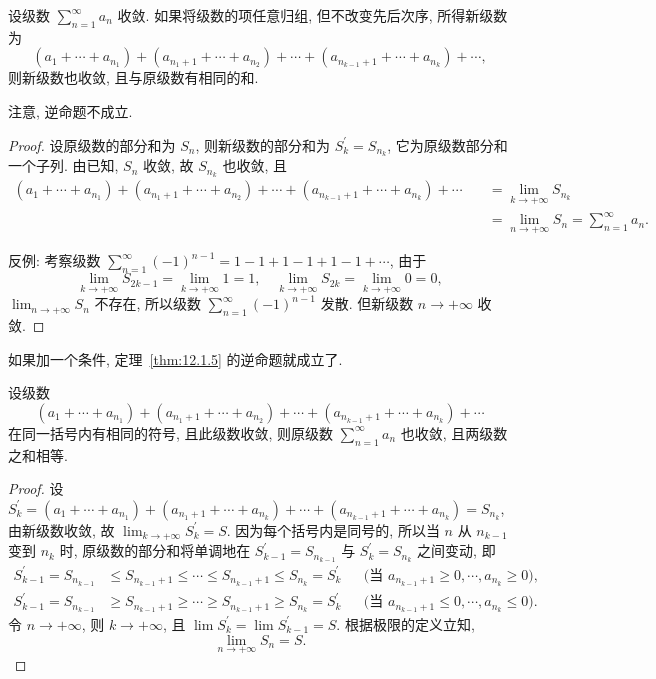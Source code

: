 \begin{theorem}\label{thm:12.1.5}
设级数 $\sum_{n=1}^{\infty}a_{n}$ 收敛. 如果将级数的项任意归组, 但不改变先后次序, 所得新级数为
\[
  (a_{1}+\cdots+a_{n_{1}})+(a_{n_{1}+1}+\cdots+a_{n_{2}})+\cdots+(a_{n_{k-1}+1}+\cdots+a_{n_{k}})+\cdots,
\]
则新级数也收敛, 且与原级数有相同的和.

注意, 逆命题不成立.
\end{theorem}

\begin{proof}
设原级数的部分和为 $S_{n}$, 则新级数的部分和为 $S_{k}^{\prime}=S_{n_{k}}$, 它为原级数部分和一个子列. 由已知, $S_{n}$ 收敛, 故 $S_{n_{k}}$ 也收敛, 且
\begin{align*}
  (a_{1}+\cdots+a_{n_{1}})+(a_{n_{1}+1}+\cdots+a_{n_{2}})+\cdots+(a_{n_{k-1}+1}+\cdots+a_{n_{k}})+\cdots
  &\quad =\lim_{k\to+\infty}S_{n_{k}} \\
  &\quad =\lim_{n\to+\infty}S_{n}=\sum_{n=1}^{\infty}a_{n}.
\end{align*}

反例: 考察级数 $\sum_{n=1}^{\infty}(-1)^{n-1}=1-1+1-1+1-1+\cdots$, 由于
\[
  \lim_{k\to+\infty}S_{2k-1}=\lim_{k\to+\infty}1=1,\quad\lim_{k\to+\infty}S_{2k}=\lim_{k\to+\infty}0=0,
\]
$\lim_{n\to+\infty}S_{n}$ 不存在, 所以级数 $\sum_{n=1}^{\infty}(-1)^{n-1}$ 发散. 但新级数 $n\to+\infty$ 收敛.
\end{proof}

如果加一个条件, 定理~\ref{thm:12.1.5} 的逆命题就成立了.

\begin{theorem}\label{thm:12.1.6}
设级数
\[
  (a_{1}+\cdots+a_{n_{1}})+(a_{n_{1}+1}+\cdots+a_{n_{2}})+\cdots+(a_{n_{k-1}+1}+\cdots+a_{n_{k}})+\cdots
\]
在同一括号内有相同的符号, 且此级数收敛, 则原级数 $\sum_{n=1}^{\infty}a_{n}$ 也收敛, 且两级数之和相等.
\end{theorem}

\begin{proof}
设 $S_{k}^{\prime}=(a_{1}+\cdots+a_{n_{1}})+(a_{n_{1}+1}+\cdots+a_{n_{k}})+\cdots+(a_{n_{k-1}+1}+\cdots+a_{n_{k}})=S_{n_{k}}$, 由新级数收敛, 故 $\lim_{k\to+\infty}S_{k}^{\prime}=S$. 因为每个括号内是同号的, 所以当 $n$ 从 $n_{k-1}$ 变到 $n_{k}$ 时, 原级数的部分和将单调地在 $S_{k-1}^{\prime}=S_{n_{k-1}}$ 与 $S_{k}^{\prime}=S_{n_{k}}$ 之间变动, 即
\begin{align*}
  S_{k-1}^{\prime}=S_{n_{k-1}}&\leqslant S_{n_{k-1}+1}\leqslant\cdots\leqslant S_{n_{k-1}+1}\leqslant S_{n_{k}}=S_{k}^{\prime}
  &&\text{(当 }a_{n_{k-1}+1}\geqslant0,\cdots,a_{n_{k}}\geqslant0\text{)}, \\
  S_{k-1}^{\prime}=S_{n_{k-1}}&\geqslant S_{n_{k-1}+1}\geqslant\cdots\geqslant S_{n_{k-1}+1}\geqslant S_{n_{k}}=S_{k}^{\prime}
  &&\text{(当 }a_{n_{k-1}+1}\leqslant0,\cdots,a_{n_{k}}\leqslant0\text{)}.
\end{align*}
令 $n\to+\infty$, 则 $k\to+\infty$, 且 $\lim S_{k}^{\prime}=\lim S_{k-1}^{\prime}=S$. 根据极限的定义立知,
\[
  \lim_{n\to+\infty}S_{n}=S.
\]
\end{proof}

